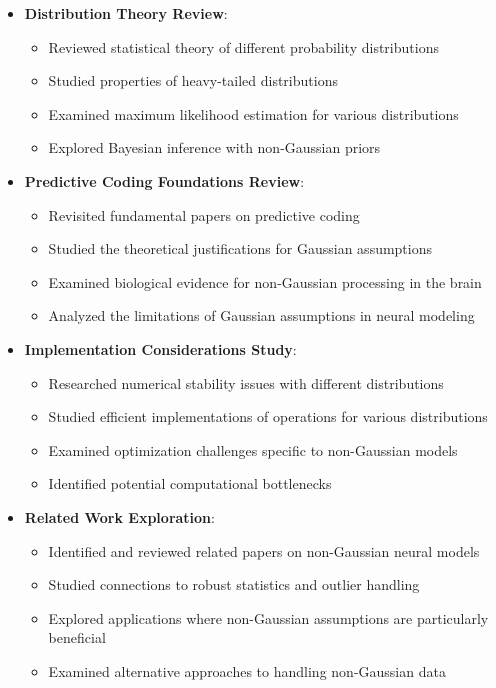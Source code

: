 \documentclass{article}
\begin{document}
\begin{itemize}
  \item \textbf{Distribution Theory Review}:
  \begin{itemize}
    \item Reviewed statistical theory of different probability distributions
    \item Studied properties of heavy-tailed distributions
    \item Examined maximum likelihood estimation for various distributions
    \item Explored Bayesian inference with non-Gaussian priors
  \end{itemize}

  \item \textbf{Predictive Coding Foundations Review}:
  \begin{itemize}
    \item Revisited fundamental papers on predictive coding
    \item Studied the theoretical justifications for Gaussian assumptions
    \item Examined biological evidence for non-Gaussian processing in the brain
    \item Analyzed the limitations of Gaussian assumptions in neural modeling
  \end{itemize}

  \item \textbf{Implementation Considerations Study}:
  \begin{itemize}
    \item Researched numerical stability issues with different distributions
    \item Studied efficient implementations of operations for various distributions
    \item Examined optimization challenges specific to non-Gaussian models
    \item Identified potential computational bottlenecks
  \end{itemize}

  \item \textbf{Related Work Exploration}:
  \begin{itemize}
    \item Identified and reviewed related papers on non-Gaussian neural models
    \item Studied connections to robust statistics and outlier handling
    \item Explored applications where non-Gaussian assumptions are particularly beneficial
    \item Examined alternative approaches to handling non-Gaussian data
  \end{itemize}
\end{itemize}
\end{document}
